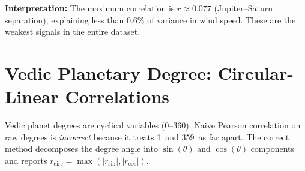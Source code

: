 \documentclass[11pt,a4paper]{article}
\begin{document}
\medskip
\noindent\textbf{Interpretation:} The maximum correlation is $r \approx 0.077$ (Jupiter--Saturn
separation), explaining less than $0.6\%$ of variance in wind speed. These are the
weakest signals in the entire dataset.

\section{Vedic Planetary Degree: Circular-Linear Correlations}

Vedic planet degrees are cyclical variables (0--360\textdegree). Naive Pearson
correlation on raw degrees is \emph{incorrect} because it treats 1\textdegree\ and
359\textdegree\ as far apart. The correct method decomposes the degree angle into
$\sin(\theta)$ and $\cos(\theta)$ components and reports
$r_{\text{circ}} = \max(|r_{\sin}|, |r_{\cos}|)$.
\end{document}
